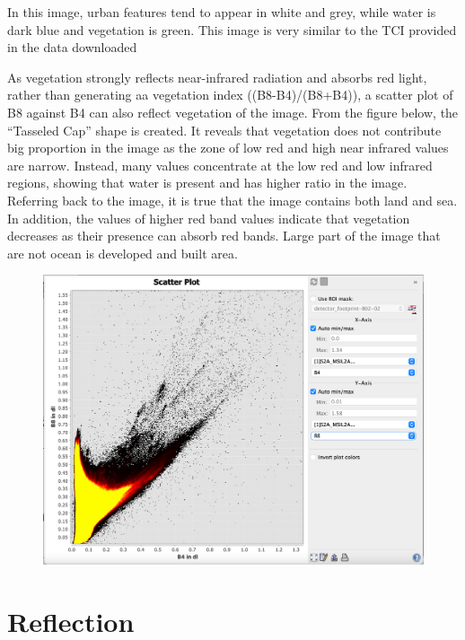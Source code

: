 \documentclass[
  letterpaper,
  DIV=11,
  numbers=noendperiod]{scrreprt}
\begin{document}
In this image, urban features tend to appear in white and grey, while
water is dark blue and vegetation is green. This image is very similar
to the TCI provided in the data downloaded

As vegetation strongly reflects near-infrared radiation and absorbs red
light, rather than generating aa vegetation index ((B8-B4)/(B8+B4)), a
scatter plot of B8 against B4 can also reflect vegetation of the image.
From the figure below, the ``Tasseled Cap'' shape is created. It reveals
that vegetation does not contribute big proportion in the image as the
zone of low red and high near infrared values are narrow. Instead, many
values concentrate at the low red and low infrared regions, showing that
water is present and has higher ratio in the image. Referring back to
the image, it is true that the image contains both land and sea. In
addition, the values of higher red band values indicate that vegetation
decreases as their presence can absorb red bands. Large part of the
image that are not ocean is developed and built area.

\begin{figure}

{\centering \includegraphics[width=1\textwidth,height=\textheight]{./figures/Screenshot 2023-02-08 at 9.15.03 PM.png}

}

\end{figure}

\hypertarget{reflection}{%
\section{Reflection}\label{reflection}}
\end{document}
